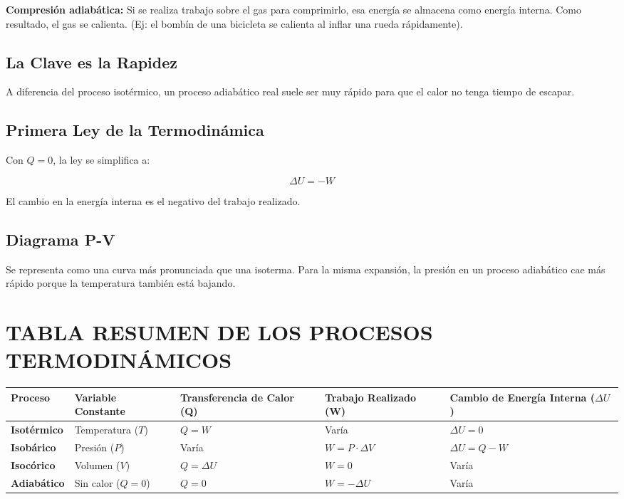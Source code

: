 \documentclass{article}
\begin{document}
\textbf{Compresión adiabática:} Si se realiza trabajo sobre el gas para comprimirlo, esa energía se almacena como energía interna. Como resultado, el gas se calienta. (Ej: el bombín de una bicicleta se calienta al inflar una rueda rápidamente).

\subsection*{La Clave es la Rapidez}

A diferencia del proceso isotérmico, un proceso adiabático real suele ser muy rápido para que el calor no tenga tiempo de escapar.

\subsection*{Primera Ley de la Termodinámica}

Con $Q = 0$, la ley se simplifica a:

$$\Delta U = -W$$

El cambio en la energía interna es el negativo del trabajo realizado.

\subsection*{Diagrama P-V}

Se representa como una curva más pronunciada que una isoterma. Para la misma expansión, la presión en un proceso adiabático cae más rápido porque la temperatura también está bajando.

\vspace{5mm}

\section*{TABLA RESUMEN DE LOS PROCESOS TERMODINÁMICOS}

\begin{center}
\begin{tabular}{|p{2.5cm}|p{2.5cm}|p{2.5cm}|p{2.5cm}|p{2.5cm}|}
\hline
\textbf{Proceso} & \textbf{Variable Constante} & \textbf{Transferencia de Calor (Q)} & \textbf{Trabajo Realizado (W)} & \textbf{Cambio de Energía Interna ($\Delta U$)} \\
\hline\hline
\textbf{Isotérmico} & Temperatura ($T$) & $Q = W$ & Varía & $\Delta U = 0$ \\
\hline
\textbf{Isobárico} & Presión ($P$) & Varía & $W = P \cdot \Delta V$ & $\Delta U = Q - W$ \\
\hline
\textbf{Isocórico} & Volumen ($V$) & $Q = \Delta U$ & $W = 0$ & Varía \\
\hline
\textbf{Adiabático} & Sin calor ($Q = 0$) & $Q = 0$ & $W = -\Delta U$ & Varía \\
\hline
\end{tabular}
\end{center}
\end{document}

